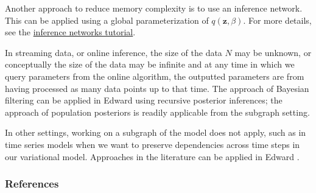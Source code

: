 Another approach to reduce memory complexity is to use an inference
network. This can be applied using a global parameterization of
$q(\mathbf{z}, \beta)$. For more details, see the
\href{/tutorials/inference-networks}{inference networks tutorial}.

In streaming data, or online inference, the size of the data $N$
may be unknown, or conceptually the size of the data may be
infinite and at any time in which we query parameters from the online
algorithm, the outputted parameters are from having processed as many
data points up to that time.
The approach of Bayesian filtering
\citep{doucet2000on,broderick2013streaming} can be applied in Edward using
recursive posterior inferences; the approach of population posteriors
\citep{mcinerney2015population} is readily applicable from the subgraph
setting.

In other settings, working on a subgraph of the model does not
apply, such as in time series models when we want to
preserve dependencies across time steps in our variational model.
Approaches in the literature can be applied in Edward
\citep{binder1997space,johnson2014stochastic,foti2014stochastic}.

\subsubsection{References}\label{references}
